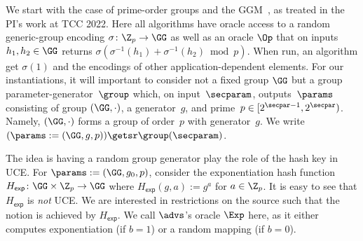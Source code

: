 {\begin{itemize}
We start with the case of prime-order groups and the GGM~\cite{EC:Shoup97}, as treated in the PI's work at TCC 2022. 
Here  all algorithms have oracle access to a random generic-group encoding  $\sigma \colon \Z_p \to \GG$ as well as an oracle $\Op$ that on inputs $h_1,h_2 \in \GG$ returns $\sigma(\sigma^{-1}(h_1) + \sigma^{-1}(h_2) \bmod p)$.  When run, an algorithm get $\sigma(1)$ and the encodings of other application-dependent elements.
For our instantiations, it will important to consider not a fixed group $\GG$ but  
a group parameter-generator~$\group$ which, on input~$\secparam$, outputs~$\params$ consisting of group  $(\GG,\cdot)$,  a generator~$g$, and prime~$p \in [2^{\secpar-1}, 2^\secpar)$. Namely,  $(\GG,\cdot)$ forms a group of order~$p$ with generator~$g$. We write~$(\params := (\GG, g, p)) \getsr \group(\secparam)$. %




The idea is having a random group generator play the role of the hash key in UCE. For $\params := (\GG, g_0, p)$, consider the exponentiation hash function $H_{\mathsf{exp}} \colon \GG \times \Z_p \to \GG$ where  $H_{\mathsf{exp}}(g,a)  := g^a$ for $a \in \Z_p$.   It is easy to see that $H_{\mathsf{exp}}$ is \emph{not} UCE. We are interested in  restrictions on the source such that the notion is achieved by $H_{\mathsf{exp}}$.  We call $\advs$'s oracle $\Exp$ here, as it either computes exponentiation (if $b=1$) or a random mapping (if $b=0$).


\end{itemize}}
